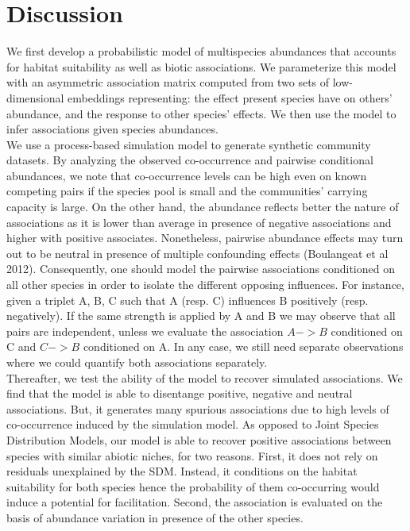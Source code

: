 \documentclass[10pt,a4paper]{article}
\begin{document}
\section{Discussion}
We first develop a probabilistic model of multispecies abundances that accounts for habitat suitability as well as biotic associations. We parameterize this model with an asymmetric association matrix computed from two sets of low-dimensional embeddings representing: the effect present species have on others' abundance, and the response to other species' effects. We then use the model to infer associations given species abundances. \\

We use a process-based simulation model to generate synthetic community datasets. By analyzing the observed co-occurrence and pairwise conditional abundances, we note that co-occurrence levels can be high even on known competing pairs if the species pool is small and the communities' carrying capacity is large. On the other hand, the abundance reflects better the nature of associations as it is lower than average in presence of negative associations and higher with positive associates. Nonetheless, pairwise abundance effects may turn out to be neutral in presence of multiple confounding effects (Boulangeat et al 2012). Consequently, one should model the pairwise associations conditioned on all other species in order to isolate the different opposing influences. For instance, given a triplet A, B, C such that A (resp. C) influences B positively (resp. negatively). If the same strength is applied by A and B we may observe that all pairs are independent, unless we evaluate the association $ A -> B $ conditioned on C and $C -> B$ conditioned on A. In any case, we still need separate observations where we could quantify both associations separately. \\

Thereafter, we test the ability of the model to recover simulated associations. We find that the model is able to disentange positive, negative and neutral associations. But, it generates many spurious associations due to high levels of co-occurrence induced by the simulation model. As opposed to Joint Species Distribution Models, our model is able to recover positive associations between species with similar abiotic niches, for two reasons. First, it does not rely on residuals unexplained by the SDM. Instead, it conditions on the habitat suitability for both species hence the probability of them co-occurring would induce a potential for facilitation. Second, the association is evaluated on the basis of abundance variation in presence of the other species. \\ 
\end{document}
